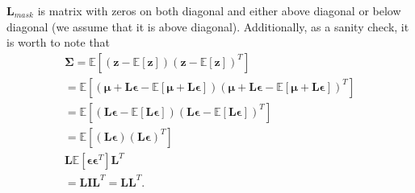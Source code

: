 \documentclass[10pt]{article}
\begin{document}
$\textbf{L}_{mask}$ is matrix with zeros on both diagonal and either above diagonal or below diagonal (we assume that it is above diagonal). Additionally, as a sanity check, it is worth to note that
\begin{gather}
\bm{\Sigma} = \mathbb{E} \left[ ( \textbf{z} - \mathbb{E}[\textbf{z}] ) 
                                ( \textbf{z} - \mathbb{E}[\textbf{z}] ) ^{T}\right] \\
    =\mathbb{E} \left[ ( \bm{\mu} + \textbf{L}\bm{\epsilon} - \mathbb{E}[\bm{\mu} + \textbf{L}\bm{\epsilon} ] ) 
     ( \bm{\mu} + \textbf{L}\bm{\epsilon} - \mathbb{E}[\bm{\mu} + \textbf{L}\bm{\epsilon} ] ) ^{T}\right] \\
     = \mathbb{E} \left[ (\textbf{L}\bm{\epsilon} - \mathbb{E}[\textbf{L}\bm{\epsilon} ] ) 
     (\textbf{L}\bm{\epsilon} - \mathbb{E}[\textbf{L}\bm{\epsilon} ] ) ^{T}\right] \\
     =\mathbb{E} \left[ (\textbf{L}\bm{\epsilon}) (\textbf{L}\bm{\epsilon} ) ^{T}\right] \\
     \textbf{L} \mathbb{E}\left[\bm{\epsilon} \bm{\epsilon}^{T}\right] \textbf{L}^{T}  \\ 
     =  \textbf{L} \mathbf{I} \textbf{L}^{T} = \textbf{L} \textbf{L}^{T}.
\end{gather}
\end{document}

